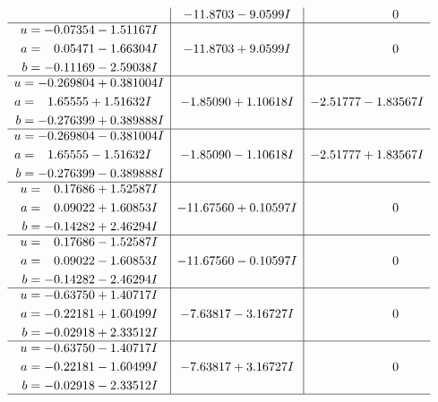 \documentclass[1p]{elsarticle_modified}
\theoremstyle{definition}
\begin{document}
$$\begin{array}{c|c|c}
 & -11.8703 - 9.0599 I & \phantom{-0.000000 } 0 \\ \hline\begin{aligned}
u &= -0.07354 - 1.51167 I \\
a &= \phantom{-}0.05471 - 1.66304 I \\
b &= -0.11169 - 2.59038 I\end{aligned}
 & -11.8703 + 9.0599 I & \phantom{-0.000000 } 0 \\ \hline\begin{aligned}
u &= -0.269804 + 0.381004 I \\
a &= \phantom{-}1.65555 + 1.51632 I \\
b &= -0.276399 + 0.389888 I\end{aligned}
 & -1.85090 + 1.10618 I & -2.51777 - 1.83567 I \\ \hline\begin{aligned}
u &= -0.269804 - 0.381004 I \\
a &= \phantom{-}1.65555 - 1.51632 I \\
b &= -0.276399 - 0.389888 I\end{aligned}
 & -1.85090 - 1.10618 I & -2.51777 + 1.83567 I \\ \hline\begin{aligned}
u &= \phantom{-}0.17686 + 1.52587 I \\
a &= \phantom{-}0.09022 + 1.60853 I \\
b &= -0.14282 + 2.46294 I\end{aligned}
 & -11.67560 + 0.10597 I & \phantom{-0.000000 } 0 \\ \hline\begin{aligned}
u &= \phantom{-}0.17686 - 1.52587 I \\
a &= \phantom{-}0.09022 - 1.60853 I \\
b &= -0.14282 - 2.46294 I\end{aligned}
 & -11.67560 - 0.10597 I & \phantom{-0.000000 } 0 \\ \hline\begin{aligned}
u &= -0.63750 + 1.40717 I \\
a &= -0.22181 + 1.60499 I \\
b &= -0.02918 + 2.33512 I\end{aligned}
 & -7.63817 - 3.16727 I & \phantom{-0.000000 } 0 \\ \hline\begin{aligned}
u &= -0.63750 - 1.40717 I \\
a &= -0.22181 - 1.60499 I \\
b &= -0.02918 - 2.33512 I\end{aligned}
 & -7.63817 + 3.16727 I & \phantom{-0.000000 } 0\\
 \hline 
 \end{array}$$\newpage\newpage\renewcommand{\arraystretch}{1}
\end{document}
